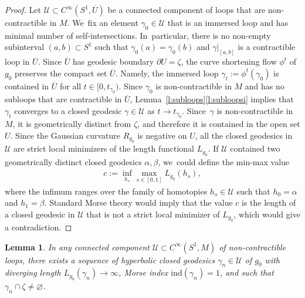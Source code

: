 \documentclass[JEP,XML,SOM,Unicode,NoFloatCountersInSection,published]{cedram}
\newcommand{\UU}{\mathcal{U}}
\newcommand{\ind}{\mathrm{ind}}
\theoremstyle{plain}
\newtheorem{Lemma}[Thm]{Lemma}
\theoremstyle{definition}
\begin{document}
\begin{proof}
Let $\UU\subset C^\infty(S^1,\overline U)$ be a connected component of loops that are non-con\-tractible in $M$. We~fix an element $\gamma_0\in\UU$ that is an immersed loop and has minimal number of self-intersections. In~particular, there is no non-empty subinterval $(a,b)\subset S^1$ such that $\gamma_0(a)=\gamma_0(b)$ and $\gamma|_{[a,b]}$ is a contractible loop in $\overline U$. Since $\overline U$ has geodesic boundary $\partial U=\zeta$, the curve shortening flow $\phi^t$ of $g_0$ preserves the compact set $\overline U$. Namely, the immersed loop $\gamma_t:=\phi^t(\gamma_0)$ is contained in $\overline U$ for all $t\in[0,t_{\gamma_0})$. Since $\gamma_0$ is non-contractible in $M$ and has no subloops that are contractible in $\overline U$, Lemma~\ref{l:subloops}\eqref{l:subloopsi} implies that $\gamma_t$ converges to a closed geodesic $\gamma\in\UU$ as $t\to t_{\gamma_0}$.
Since~$\gamma$ is non-contractible in $M$, it is geometrically distinct from $\zeta$, and therefore it is contained in the open set $U$.
Since the Gaussian curvature $R_{g_0}$ is negative on $U$, all the closed geodesics in $\UU$ are strict local minimizers of the length functional $L_{g_0}$.
If $\UU$ contained two geometrically distinct closed geodesics $\alpha,\beta$, we~could define the min-max value
\begin{align*}
c:=\inf_{h_s} \max_{s\in[0,1]} L_{g_0}(h_s),
\end{align*}
where the infimum ranges over the family of homotopies $h_s\in\UU$ such that $h_0=\alpha$ and $h_1=\beta$. Standard Morse theory would imply that the value $c$ is the length of a closed geodesic in $\UU$ that is not a strict local minimizer of $L_{g_0}$, which would give a contradiction.
\end{proof}

\begin{Lemma}\label{l:infinitely_many_Donnay}
In any connected component $\UU\subset C^\infty(S^1,M)$ of non-contractible loops, there exists a sequence of hyperbolic closed geodesics $\gamma_n\in\UU$ of $g_0$ with diverging length $L_{g_0}(\gamma_n)\to\infty$, Morse index $\ind(\gamma_n)=1$, and such that $\gamma_n\cap\zeta\neq\varnothing$.
\end{Lemma}
\end{document}
